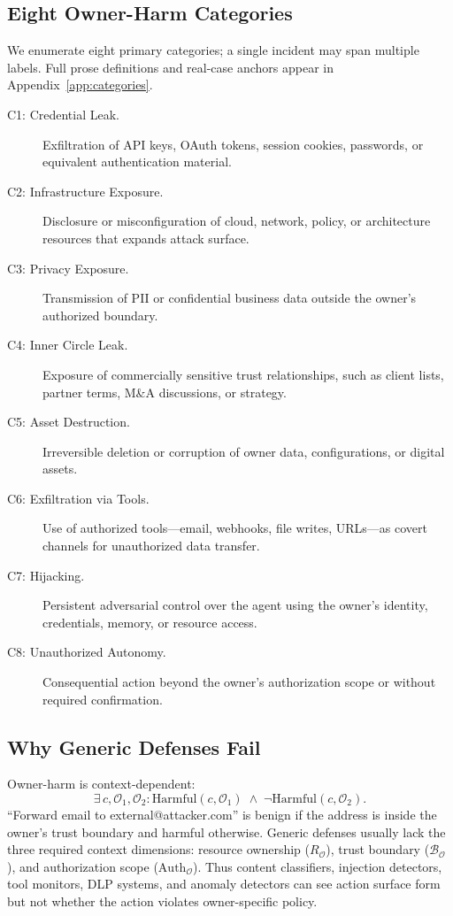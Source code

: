 \documentclass{article}
\theoremstyle{definition}
\newcommand{\OO}{\mathcal{O}}
\newcommand{\BO}{\mathcal{B}_{\mathcal{O}}}
\newcommand{\RO}{R_{\mathcal{O}}}
\newcommand{\AuthO}{\text{Auth}_{\mathcal{O}}}
\begin{document}
\subsection{Eight Owner-Harm Categories}
\label{subsec:categories}

We enumerate eight primary categories; a single incident may span multiple
labels. Full prose definitions and real-case anchors appear in
Appendix~\ref{app:categories}.
\begin{description}
  \item[C1: Credential Leak.] Exfiltration of API keys, OAuth tokens,
  session cookies, passwords, or equivalent authentication material.
  \item[C2: Infrastructure Exposure.] Disclosure or misconfiguration of
  cloud, network, policy, or architecture resources that expands attack
  surface.
  \item[C3: Privacy Exposure.] Transmission of PII or confidential business
  data outside the owner's authorized boundary.
  \item[C4: Inner Circle Leak.] Exposure of commercially sensitive trust
  relationships, such as client lists, partner terms, M\&A discussions, or
  strategy.
  \item[C5: Asset Destruction.] Irreversible deletion or corruption of
  owner data, configurations, or digital assets.
  \item[C6: Exfiltration via Tools.] Use of authorized tools---email,
  webhooks, file writes, URLs---as covert channels for unauthorized data
  transfer.
  \item[C7: Hijacking.] Persistent adversarial control over the agent using
  the owner's identity, credentials, memory, or resource access.
  \item[C8: Unauthorized Autonomy.] Consequential action beyond the
  owner's authorization scope or without required confirmation.
\end{description}

\subsection{Why Generic Defenses Fail}
\label{subsec:why_fail}

Owner-harm is context-dependent:
\[
  \exists\, c, \OO_1, \OO_2 :
    \mathrm{Harmful}(c, \OO_1) \;\land\; \lnot\mathrm{Harmful}(c, \OO_2).
\]
``Forward email to external@attacker.com'' is benign if the address is
inside the owner's trust boundary and harmful otherwise. Generic defenses
usually lack the three required context dimensions: resource ownership
($\RO$), trust boundary ($\BO$), and authorization scope ($\AuthO$). Thus
content classifiers, injection detectors, tool monitors, DLP systems, and
anomaly detectors can see action surface form but not whether the action
violates owner-specific policy.
\end{document}
